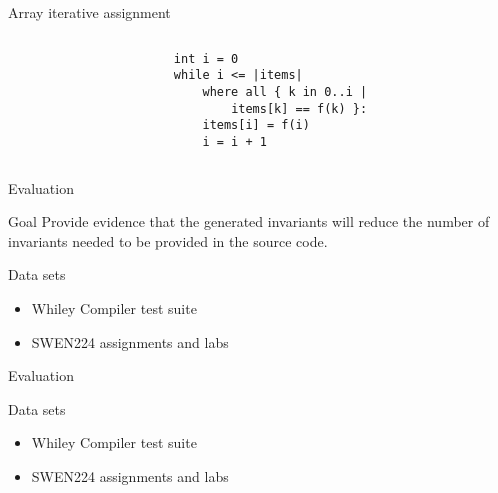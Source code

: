 \begin{frame}[fragile]{Array iterative assignment}

\begin{columns}

\begin{column}{0.5\textwidth}
\end{column}

\begin{column}{0.5\textwidth}
\begin{verbatim}
int i = 0
while i <= |items|
    where all { k in 0..i |
        items[k] == f(k) }:
    items[i] = f(i)
    i = i + 1
\end{verbatim}
\end{column}

\end{columns}

\end{frame}

\begin{frame}{Evaluation}

\begin{block}{Goal}
Provide evidence that the generated invariants will reduce the
number of invariants needed to be provided in the source code.
\end{block}

\begin{block}{Data sets}

\begin{itemize}
\item Whiley Compiler test suite
\item SWEN224 assignments and labs
\end{itemize}

\end{block}

\end{frame}

\begin{frame}{Evaluation}

\begin{block}{Data sets}

\begin{itemize}
\item Whiley Compiler test suite
\item SWEN224 assignments and labs
\end{itemize}

\end{block}

\end{frame}



